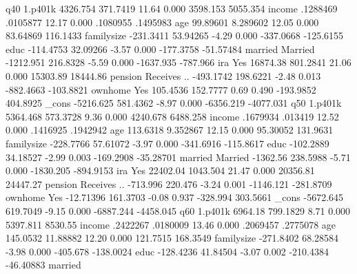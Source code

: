 q40          {\VBAR}
     1.p401k {\VBAR}   4326.754   371.7419    11.64   0.000     3598.153    5055.354
      income {\VBAR}   .1288469   .0105877    12.17   0.000     .1080955    .1495983
         age {\VBAR}   99.89601   8.289602    12.05   0.000     83.64869    116.1433
  familysize {\VBAR}  -231.3411   53.94265    -4.29   0.000    -337.0668   -125.6155
        educ {\VBAR}  -114.4753   32.09266    -3.57   0.000    -177.3758   -51.57484
             {\VBAR}
     married {\VBAR}
    Married  {\VBAR}  -1212.951   216.8328    -5.59   0.000    -1637.935    -787.966
             {\VBAR}
         ira {\VBAR}
        Yes  {\VBAR}   16874.38   801.2841    21.06   0.000     15303.89    18444.86
             {\VBAR}
     pension {\VBAR}
Receives ..  {\VBAR}  -493.1742   198.6221    -2.48   0.013    -882.4663   -103.8821
             {\VBAR}
     ownhome {\VBAR}
        Yes  {\VBAR}   105.4536   152.7777     0.69   0.490    -193.9852    404.8925
       _cons {\VBAR}  -5216.625   581.4362    -8.97   0.000    -6356.219   -4077.031
q50          {\VBAR}
     1.p401k {\VBAR}   5364.468   573.3728     9.36   0.000     4240.678    6488.258
      income {\VBAR}   .1679934    .013419    12.52   0.000     .1416925    .1942942
         age {\VBAR}   113.6318   9.352867    12.15   0.000     95.30052    131.9631
  familysize {\VBAR}  -228.7766   57.61072    -3.97   0.000    -341.6916   -115.8617
        educ {\VBAR}  -102.2889   34.18527    -2.99   0.003    -169.2908   -35.28701
             {\VBAR}
     married {\VBAR}
    Married  {\VBAR}   -1362.56   238.5988    -5.71   0.000    -1830.205   -894.9153
             {\VBAR}
         ira {\VBAR}
        Yes  {\VBAR}   22402.04   1043.504    21.47   0.000     20356.81    24447.27
             {\VBAR}
     pension {\VBAR}
Receives ..  {\VBAR}   -713.996    220.476    -3.24   0.001    -1146.121   -281.8709
             {\VBAR}
     ownhome {\VBAR}
        Yes  {\VBAR}  -12.71396   161.3703    -0.08   0.937     -328.994    303.5661
       _cons {\VBAR}  -5672.645   619.7049    -9.15   0.000    -6887.244   -4458.045
q60          {\VBAR}
     1.p401k {\VBAR}    6964.18   799.1829     8.71   0.000     5397.811     8530.55
      income {\VBAR}   .2422267   .0180009    13.46   0.000     .2069457    .2775078
         age {\VBAR}   145.0532   11.88882    12.20   0.000     121.7515    168.3549
  familysize {\VBAR}  -271.8402   68.28584    -3.98   0.000     -405.678   -138.0024
        educ {\VBAR}  -128.4236   41.84504    -3.07   0.002    -210.4384   -46.40883
             {\VBAR}
     married {\VBAR}
